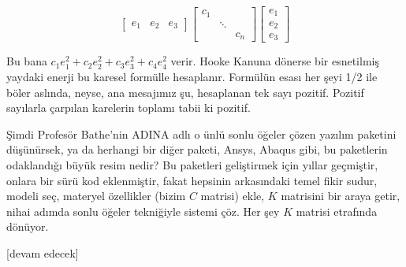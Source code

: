 \documentclass[12pt,fleqn]{article}\usepackage{../../common}
\begin{document}
$$
\left[\begin{array}{rrr}
e_1 & e_2 & e_3 
\end{array}\right]
\left[\begin{array}{rrr}
c_1 &        & \\
    & \ddots & \\
    &        & c_n
\end{array}\right]
\left[\begin{array}{r}
e_1 \\ e_2 \\ e_3
\end{array}\right]
$$

Bu bana $c_1 e_1^2 + c_2 e_2^2 + c_3 e_3^2 + c_4 e_4^2$ verir. Hooke Kanuna
dönerse bir esnetilmiş yaydaki enerji bu karesel formülle hesaplanır. Formülün
esası her şeyi 1/2 ile böler aslında, neyse, ana mesajımız şu, hesaplanan tek
sayı pozitif. Pozitif sayılarla çarpılan karelerin toplamı tabii ki pozitif.

Şimdi Profesör Bathe'nin ADINA adlı o ünlü sonlu öğeler çözen yazılım paketini
düşünürsek, ya da herhangi bir diğer paketi, Ansys, Abaqus gibi, bu paketlerin
odaklandığı büyük resim nedir? Bu paketleri geliştirmek için yıllar geçmiştir,
onlara bir sürü kod eklenmiştir, fakat hepsinin arkasındaki temel fikir sudur,
modeli seç, materyel özellikler (bizim $C$ matrisi) ekle, $K$ matrisini bir
araya getir, nihai adımda sonlu öğeler tekniğiyle sistemi çöz. Her şey $K$
matrisi etrafında dönüyor.


















[devam edecek]
\end{document}
